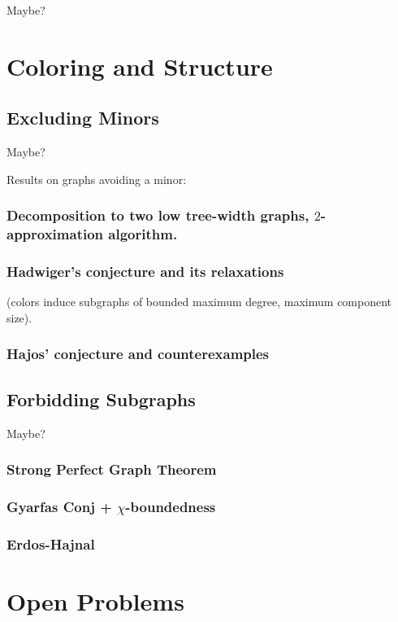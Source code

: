 \documentclass[12pt,twoside,openright,a4paper]{book}
\begin{document}
Maybe?

\part{Coloring and Structure}

\chapter{Excluding Minors}

Maybe?

Results on graphs avoiding a minor:


\section{Decomposition to two low tree-width graphs, $2$-approximation algorithm.}
\section{Hadwiger's conjecture and its relaxations}
(colors induce subgraphs of bounded maximum degree, maximum component size).
\section{Hajos' conjecture and counterexamples}

\chapter{Forbidding Subgraphs}

Maybe?

\section{Strong Perfect Graph Theorem}
\section{Gyarfas Conj + $\chi$-boundedness}
\section{Erdos-Hajnal}

\part{Open Problems}
\end{document}
